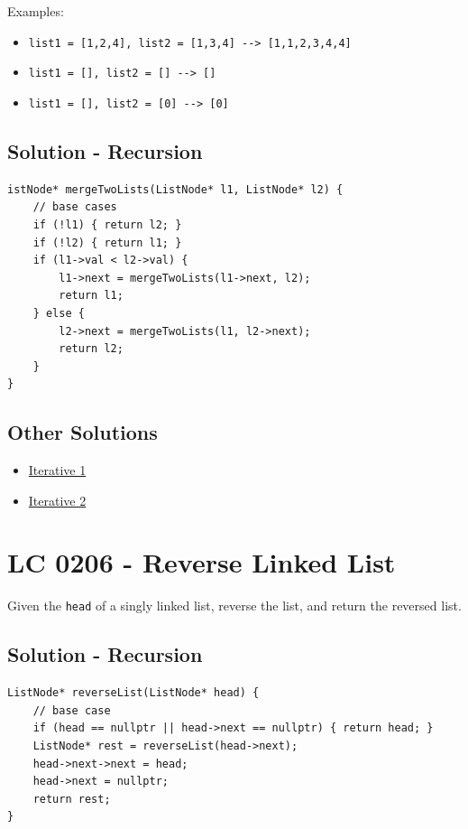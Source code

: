 Examples:
\begin{itemize}
\item {\colorbox{CodeBackground}{\lstinline|list1 = [1,2,4], list2 = [1,3,4] --> [1,1,2,3,4,4]|}}
\item {\colorbox{CodeBackground}{\lstinline|list1 = [], list2 = [] --> []|}}
\item {\colorbox{CodeBackground}{\lstinline|list1 = [], list2 = [0] --> [0]|}}
\end{itemize}

\subsection*{Solution - Recursion}\label{solution:lc0021_recursion}
\begin{lstlisting}
istNode* mergeTwoLists(ListNode* l1, ListNode* l2) {
	// base cases
	if (!l1) { return l2; }
	if (!l2) { return l1; }
	if (l1->val < l2->val) {
		l1->next = mergeTwoLists(l1->next, l2);
		return l1;
	} else {
		l2->next = mergeTwoLists(l1, l2->next);
		return l2;
	}
}
\end{lstlisting}

\subsection*{Other Solutions}
\begin{itemize}
	\item \hyperref[solution:lc0021_iterative1]{Iterative 1}
	\item \hyperref[solution:lc0021_iterative2]{Iterative 2}
\end{itemize}

\section{LC 0206 - Reverse Linked List}
Given the {\colorbox{CodeBackground}{\lstinline|head|}} of a singly linked list, reverse the list, and return the reversed list.

\subsection*{Solution - Recursion}\label{solution:lc0206_recursion}
\begin{lstlisting}
ListNode* reverseList(ListNode* head) {
	// base case
	if (head == nullptr || head->next == nullptr) { return head; }
	ListNode* rest = reverseList(head->next);
	head->next->next = head;
	head->next = nullptr;
	return rest;
}
\end{lstlisting}

